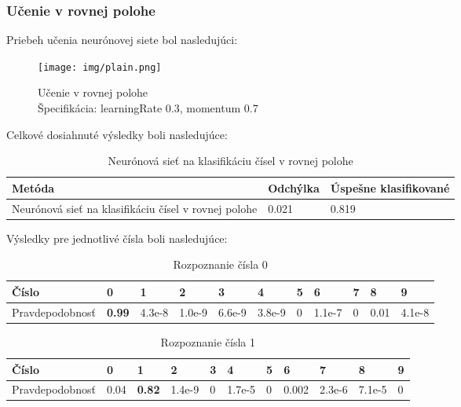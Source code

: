 \subsubsection{Učenie v rovnej polohe} %

Priebeh učenia neurónovej siete bol nasledujúci:

\begin{figure}[ht]
    \begin{center}
        \texttt{[image: img/plain.png]}
        \caption{Učenie v rovnej polohe\\
        Špecifikácia: learningRate 0.3, momentum 0.7}
    \end{center}
\end{figure}

Celkové dosiahnuté výsledky boli nasledujúce:

\begin{table}[H]
  \begin{tabular}{ | l | l | l |}
    \hline
    Metóda & Odchýlka & Úspešne klasifikované \\ \hline
    Neurónová sieť na klasifikáciu čísel v rovnej polohe & 0.021 & 0.819 \\
    \hline
  \end{tabular}
  \caption[Neurónová sieť na klasifikáciu čísel v rovnej polohe]{Neurónová sieť na klasifikáciu čísel v rovnej polohe}
\end{table}

\newpage
Výsledky pre jednotlivé čísla boli nasledujúce:

\begin{table}[H]
  \begin{tabular}{ | l | l | l | l | l | l | l | l | l | l | l |}
    \hline
    Číslo & 0 & 1 & 2 & 3 & 4 & 5 & 6 & 7 & 8 & 9 \\ \hline
    Pravdepodobnosť & \textbf{0.99} & 4.3e-8 & 1.0e-9 & 6.6e-9 & 3.8e-9 & 0 & 1.1e-7 & 0 & 0.01 & 4.1e-8 \\
    \hline
  \end{tabular}
  \caption[Rozpoznanie čísla 0]{Rozpoznanie čísla 0}
\end{table}

\begin{table}[H]
  \begin{tabular}{ | l | l | l | l | l | l | l | l | l | l | l |}
    \hline
    Číslo & 0 & 1 & 2 & 3 & 4 & 5 & 6 & 7 & 8 & 9 \\ \hline
    Pravdepodobnosť & 0.04 & \textbf{0.82} & 1.4e-9 & 0 & 1.7e-5 & 0 & 0.002 & 2.3e-6 & 7.1e-5 & 0 \\
    \hline
  \end{tabular}
  \caption[Rozpoznanie čísla 1]{Rozpoznanie čísla 1}
\end{table}

